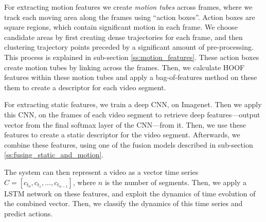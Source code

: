 For extracting motion features we create \textit{motion tubes} across frames, where we track each moving area along the frames using ``action boxes''.
Action boxes are square regions, which contain significant motion in each frame. We choose candidate areas by first creating dense trajectories for each frame,
and then clustering trajectory points preceded by a significant amount of pre-processing. This process is explained in sub-section \ref{ss:motion_features}.
These action boxes create motion tubes by linking across the frames. Then, we calculate HOOF~\cite{chaudhry2009histograms} features within these motion tubes and apply a
bag-of-features method on these them to create a descriptor for each video segment.

For extracting static features, we train a deep CNN, on Imagenet. Then we apply this CNN,
on the frames of each video segment to retrieve deep features---output vector from the final softmax layer of the CNN---from it. Then, we use these features
to create a static descriptor for the video segment. Afterwards, we combine these features, using one of the fusion models described in sub-section \ref{ss:fusing_static_and_motion}.

The system can then represent a video as a vector time series $C = [c_{t_0}, c_{t_1}, \dots, c_{t_{n-1}}]$,
where $n$ is the number of segments. Then, we apply a LSTM network on these features, and exploit the dynamics of time evolution of the combined vector.
Then, we classify the dynamics of this time series and predict actions.



